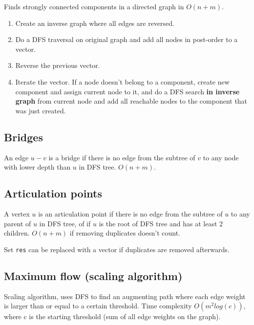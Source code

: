 \documentclass{article}
\begin{document}
Finds strongly connected components in a directed graph in $O(n + m)$.

\begin{enumerate}
	\item Create an inverse graph where all edges are reversed.
	\item Do a DFS traversal on original graph and add all nodes in post-order to a vector.
	\item Reverse the previous vector.
	\item Iterate the vector. If a node doesn't belong to a component, create new component and assign current node to it, and do a DFS search \textbf{in inverse graph} from current node and add all reachable nodes to the component that was just created.
\end{enumerate}

\subsection {Bridges}

An edge $u-v$ is a bridge if there is no edge from the subtree of $v$ to any node with lower depth than $u$ in DFS tree. $O(n+m)$.



\subsection {Articulation points}

A vertex $u$ is an articulation point if there is no edge from the subtree of $u$ to any parent of $u$ in DFS tree, of if $u$ is the root of DFS tree and has at least $2$ children. $O(n+m)$ if removing duplicates doesn't count.

Set \texttt{res} can be replaced with a vector if duplicates are removed afterwards.



\subsection {Maximum flow (scaling algorithm)}

Scaling algorithm, uses DFS to find an augmenting path where each edge weight is larger than or equal to a certain threshold. Time complexity $O(m^2log(c))$, where c is the starting threshold (sum of all edge weights on the graph).
\end{document}
